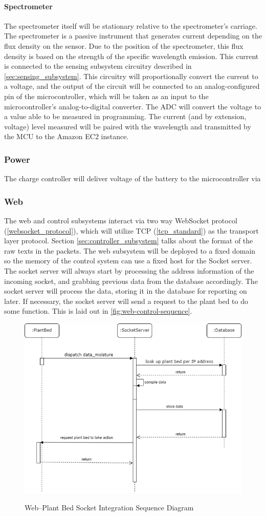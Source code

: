 \paragraph{Spectrometer} The spectrometer itself will be stationary relative to the spectrometer's carriage. The spectrometer is a passive instrument that generates current depending on the flux density on the sensor. Due to the position of the spectrometer, this flux density is based on the strength of the specific wavelength emission. This current is connected to the sensing subsystem circuitry described in \ref{sec:sensing_subsystem}. This circuitry will proportionally convert the current to a voltage, and the output of the circuit will be connected to an analog-configured pin of the microcontroller, which will be taken as an input to the microcontroller's analog-to-digital converter. The ADC will convert the voltage to a value able to be measured in programming. The current (and by extension, voltage) level measured will be paired with the wavelength and transmitted by the MCU to the Amazon EC2 instance.

\subsubsection{Power} The charge controller will deliver voltage of the battery to the microcontroller via

\subsubsection{Web}
The web and control subsystems interact via two way WebSocket protocol (\ref{websocket_protocol}), which will utilize TCP (\ref{tcp_standard}) as the transport layer protocol. Section \ref{sec:controller_subsystem} talks about the format of the raw texts in the packets. The web subsystem will be deployed to a fixed domain so the memory of the control system can use a fixed host for the Socket server. The socket server will always start by processing the address information of the incoming socket, and grabbing previous data from the database accordingly. The socket server will process the data, storing it in the database for reporting on later. If necessary, the socket server will send a request to the plant bed to do some function. This is laid out in \autoref{fig:web-control-sequence}.

\begin{figure}[H]
    \caption{Web--Plant Bed Socket Integration Sequence Diagram}
    \centering
    \includegraphics[width=.75\textwidth]{images/web-control-integration-sequence.png}
    \label{fig:web-control-sequence}
\end{figure}

